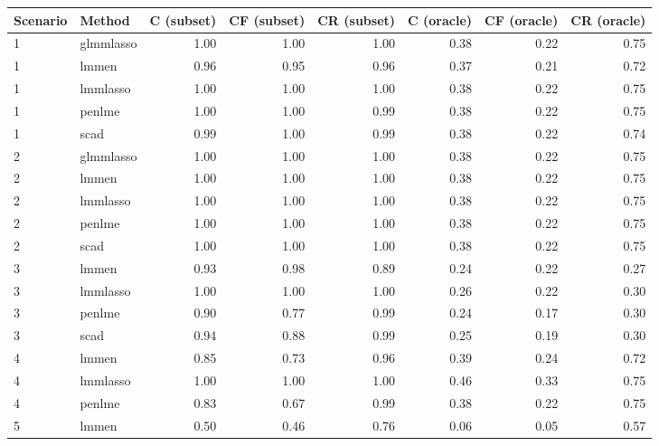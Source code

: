 \begin{table}[ht]
\centering
\begin{tabular}{llrrrrrr}
  \hline
Scenario & Method & C (subset) & CF (subset) & CR (subset) & C (oracle) & CF (oracle) & CR (oracle) \\ 
  \hline
1 & glmmlasso & 1.00 & 1.00 & 1.00 & 0.38 & 0.22 & 0.75 \\ 
  1 & lmmen & 0.96 & 0.95 & 0.96 & 0.37 & 0.21 & 0.72 \\ 
  1 & lmmlasso & 1.00 & 1.00 & 1.00 & 0.38 & 0.22 & 0.75 \\ 
  1 & penlme & 1.00 & 1.00 & 0.99 & 0.38 & 0.22 & 0.75 \\ 
  1 & scad & 0.99 & 1.00 & 0.99 & 0.38 & 0.22 & 0.74 \\ 
  2 & glmmlasso & 1.00 & 1.00 & 1.00 & 0.38 & 0.22 & 0.75 \\ 
  2 & lmmen & 1.00 & 1.00 & 1.00 & 0.38 & 0.22 & 0.75 \\ 
  2 & lmmlasso & 1.00 & 1.00 & 1.00 & 0.38 & 0.22 & 0.75 \\ 
  2 & penlme & 1.00 & 1.00 & 1.00 & 0.38 & 0.22 & 0.75 \\ 
  2 & scad & 1.00 & 1.00 & 1.00 & 0.38 & 0.22 & 0.75 \\ 
  3 & lmmen & 0.93 & 0.98 & 0.89 & 0.24 & 0.22 & 0.27 \\ 
  3 & lmmlasso & 1.00 & 1.00 & 1.00 & 0.26 & 0.22 & 0.30 \\ 
  3 & penlme & 0.90 & 0.77 & 0.99 & 0.24 & 0.17 & 0.30 \\ 
  3 & scad & 0.94 & 0.88 & 0.99 & 0.25 & 0.19 & 0.30 \\ 
  4 & lmmen & 0.85 & 0.73 & 0.96 & 0.39 & 0.24 & 0.72 \\ 
  4 & lmmlasso & 1.00 & 1.00 & 1.00 & 0.46 & 0.33 & 0.75 \\ 
  4 & penlme & 0.83 & 0.67 & 0.99 & 0.38 & 0.22 & 0.75 \\ 
  5 & lmmen & 0.50 & 0.46 & 0.76 & 0.06 & 0.05 & 0.57 \\ 
   \hline
\end{tabular}
\end{table}
